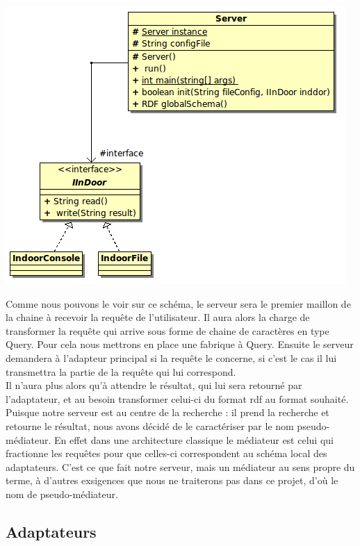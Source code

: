\documentclass[12pt]{article}
\begin{document}
\begin{center}
	\includegraphics[scale=0.70]{images/Serveur.png}
\end{center}

	Comme nous pouvons le voir sur ce schéma, le serveur sera le premier maillon de la chaine à recevoir la requête de l'utilisateur. Il aura alors la charge de transformer la requête qui arrive sous forme de chaine de caractères en type Query. Pour cela nous mettrons en place une fabrique à Query. Ensuite le serveur demandera à l'adapteur principal si la requête le concerne, si c'est le cas il lui transmettra la partie de la requête qui lui correspond.\\
	\indent Il n'aura plus alors qu'à attendre le résultat, qui lui sera retourné par l'adaptateur, et au besoin transformer celui-ci du format rdf au format souhaité.\\
	\indent Puisque notre serveur est au centre de la recherche : il prend la recherche et retourne le résultat, nous avons décidé de le caractériser par le nom pseudo-médiateur. En effet dans une architecture classique le médiateur est celui qui fractionne les requêtes pour que celles-ci correspondent au schéma local des adaptateurs. C'est ce que fait notre serveur, mais un médiateur au sens propre du terme, à d'autres exsigences que nous ne traiterons pas dans ce projet, d'où le nom de pseudo-médiateur.

\subsection{Adaptateurs}
\end{document}
